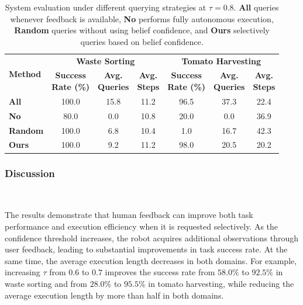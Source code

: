 \begin{table}[t]
\centering
\caption{System evaluation under different querying strategies at $\tau=0.8$. \textbf{All} queries whenever feedback is available, \textbf{No} performs fully autonomous execution, \textbf{Random} queries without using belief confidence, and \textbf{Ours} selectively queries based on belief confidence.}
\label{tab:system_eval}
\small
\setlength{\tabcolsep}{4pt}
\begin{tabular*}{\textwidth}{@{\extracolsep{\fill}}lcccccc}
\toprule
\multirow{2}{*}{\textbf{Method}} & \multicolumn{3}{c}{\textbf{Waste Sorting}} & \multicolumn{3}{c}{\textbf{Tomato Harvesting}} \\
\cmidrule(lr){2-4}\cmidrule(lr){5-7}
& \makecell{\textbf{Success}\\\textbf{Rate (\%)}} & \makecell{\textbf{Avg.}\\\textbf{Queries}} & \makecell{\textbf{Avg.}\\\textbf{Steps}} & \makecell{\textbf{Success}\\\textbf{Rate (\%)}} & \makecell{\textbf{Avg.}\\\textbf{Queries}} & \makecell{\textbf{Avg.}\\\textbf{Steps}} \\
\midrule
\textbf{All}    & 100.0 & 15.8 & 11.2 & 96.5 & 37.3 & 22.4 \\
\textbf{No}     & 80.0  & 0.0  & 10.8 & 20.0 & 0.0  & 36.9 \\
\textbf{Random} & 100.0 & 6.8  & 10.4 & 1.0  & 16.7 & 42.3 \\
\textbf{Ours}   & 100.0 & 9.2  & 11.2 & 98.0 & 20.5 & 20.2 \\
\bottomrule
\end{tabular*}
\end{table}


\subsubsection{Discussion}~\label{exp:sys_discussion}

The results demonstrate that human feedback can improve both task performance and execution efficiency when it is requested selectively. As the confidence threshold increases, the robot acquires additional observations through user feedback, leading to substantial improvements in task success rate. At the same time, the average execution length decreases in both domains. For example, increasing $\tau$ from $0.6$ to $0.7$ improves the success rate from $58.0\%$ to $92.5\%$ in waste sorting and from $28.0\%$ to $95.5\%$ in tomato harvesting, while reducing the average execution length by more than half in both domains.

